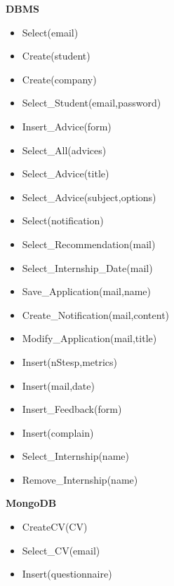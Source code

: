 	\textbf{DBMS}
	\begin{itemize}
		\item Select(email)
		\item Create(student)
		\item Create(company)
		\item Select\_Student(email,password)
		\item Insert\_Advice(form)
		\item Select\_All(advices)
		\item Select\_Advice(title)
		\item Select\_Advice(subject,options)
		\item Select(notification)
		\item Select\_Recommendation(mail)
		\item Select\_Internship\_Date(mail)
		\item Save\_Application(mail,name)
		\item Create\_Notification(mail,content)
		\item Modify\_Application(mail,title)
		\item Insert(nStesp,metrics)
		\item Insert(mail,date)
		\item Insert\_Feedback(form)
		\item Insert(complain)
		\item Select\_Internship(name)
		\item Remove\_Internship(name)
	\end{itemize}
	
	\textbf{MongoDB}
	\begin{itemize}
		\item CreateCV(CV)
		\item Select\_CV(email)
		\item Insert(questionnaire)
	\end{itemize}













